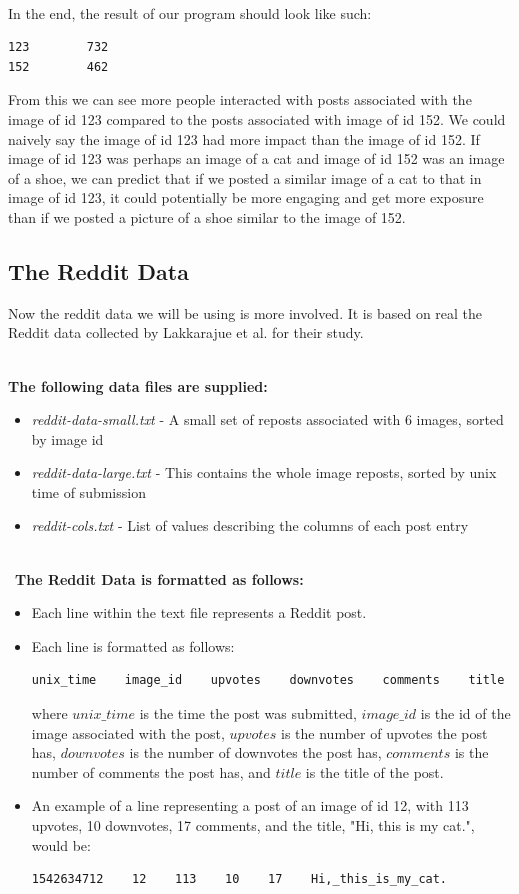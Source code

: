 \documentclass{article}
\begin{document}
\-\ \\In the end, the result of our program should look like such:
\begin{lstlisting}[language=bash]
123        732
152        462
\end{lstlisting}
From this we can see more people interacted with posts associated with the  image of id 123 compared to the posts associated with image of id 152. We could naively say the image of id 123 had more impact than the image of id 152. If image of id 123 was perhaps an image of a cat and image of id 152 was an image of a shoe, we can predict that if we posted a similar image of a cat to that in image of id 123, it could potentially be more engaging and get more exposure than if we posted a picture of a shoe similar to the image of 152.

\subsection*{The Reddit Data}
Now the reddit data we will be using is more involved. It is based on real the Reddit data collected by Lakkarajue et al. for their study.

\-\ \\ \textbf{The following data files are supplied:}
\begin{itemize}
    \item \textit{reddit-data-small.txt} - A small set of reposts associated with 6 images, sorted by image id
    \item \textit{reddit-data-large.txt} - This contains the whole image reposts, sorted by unix time of submission
    \item \textit{reddit-cols.txt} - List of values describing the columns of each post entry
\end{itemize}

\-\\\ \textbf{The Reddit Data is formatted as follows:}
\begin{itemize}
    \item Each line within the text file represents a Reddit post. 
    \item Each line is formatted as follows: 
             \begin{lstlisting}[language=bash]
 unix_time    image_id    upvotes    downvotes    comments    title
             \end{lstlisting}
             where $unix\_time$ is the time the post was submitted, $image\_id$ is the id of the image associated with the post, $upvotes$ is the number of upvotes the post has, $downvotes$ is the number of downvotes the post has, $comments$ is the number of comments the post has, and $title$ is the title of the post. 
    \item An example of a line representing a post of an image of id 12, with 113 upvotes, 10 downvotes, 17 comments, and the title, "Hi, this is my cat.", would be: 
                 \begin{lstlisting}[language=bash]
 1542634712    12    113    10    17    Hi,_this_is_my_cat.
             \end{lstlisting}
\end{itemize}
\end{document}
